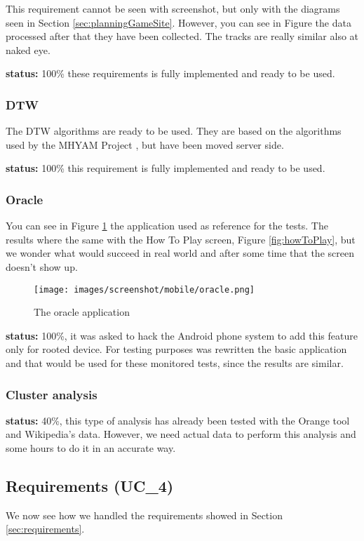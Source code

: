This requirement cannot be seen with screenshot, but only with the diagrams seen in Section \ref{sec:planningGameSite}. However, you can see in Figure the data processed after that they have been collected. The tracks are really similar also at naked eye.

\textbf{status:} 100\% these requirements is fully implemented and ready to be used.

\subsubsection{DTW}
The DTW algorithms are ready to be used. They are based on the algorithms used by the MHYAM Project \cite{MHYAM}, but have been moved server side.

\textbf{status:} 100\% this requirement is fully implemented and ready to be used.

\subsubsection{Oracle}
You can see in Figure \ref{fig:oracle} the application used as reference for the tests. The results where the same with the How To Play screen, Figure \ref{fig:howToPlay}, but we wonder what would succeed in real world and after some time that the screen doesn't show up.

\begin{figure}[H]
\centering %
\texttt{[image: images/screenshot/mobile/oracle.png]}
\caption{The oracle application}
\label{fig:oracle}
\end{figure}

\textbf{status:} 100\%, it was asked to hack the Android phone system to add this feature only for rooted device. For testing purposes was rewritten the basic application and that would be used for these monitored tests, since the results are similar.

\subsubsection{Cluster analysis}

\textbf{status:} 40\%, this type of analysis has already been tested with the Orange tool and Wikipedia's data. However, we need actual data to perform this analysis and some hours to do it in an accurate way.

\subsection{Requirements (UC\_4)}
We now see how we handled the requirements showed in Section \ref{sec:requirements}.

